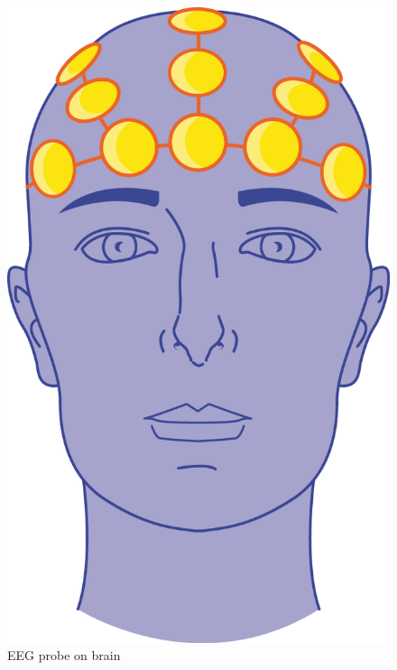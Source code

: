 \begin{figure}[!htb]
    \centering
    \includegraphics[scale=0.5]{Chap2/EEGonbrain.png}
    \caption{EEG probe on brain}
    \label{fig:my_label}
\end{figure}